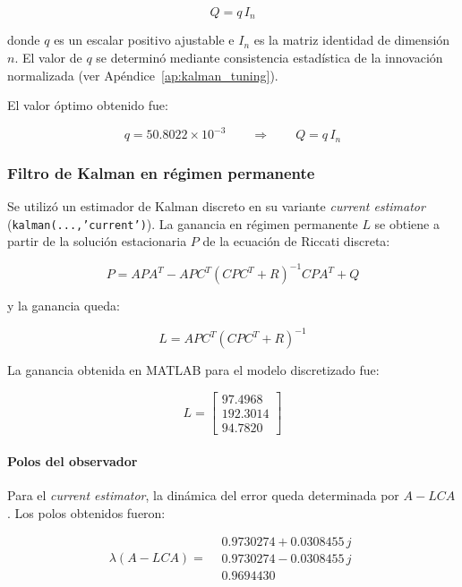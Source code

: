 \[
Q = q\,I_n
\]

donde $q$ es un escalar positivo ajustable e $I_n$ es la matriz identidad
de dimensión $n$. El valor de $q$ se determinó mediante consistencia
estadística de la innovación normalizada (ver Apéndice~\ref{ap:kalman_tuning}).

El valor óptimo obtenido fue:

\[
q = 50.8022\times 10^{-3}
\qquad\Longrightarrow\qquad
Q = q\,I_n
\]

\subsubsection{Filtro de Kalman en régimen permanente}

Se utilizó un estimador de Kalman discreto en su variante \textit{current estimator}
(\texttt{kalman(...,'current')}). La ganancia en régimen permanente \(L\) se obtiene
a partir de la solución estacionaria \(P\) de la ecuación de Riccati discreta:

\[
P = A P A^T - A P C^T \left(C P C^T + R\right)^{-1} C P A^T + Q
\]

y la ganancia queda:

\[
L = A P C^T \left(C P C^T + R\right)^{-1}
\]

La ganancia obtenida en MATLAB para el modelo discretizado fue:

\[
L =
\begin{bmatrix}
	97.4968\\
	192.3014\\
	94.7820
\end{bmatrix}
\]

\paragraph{Polos del observador}

Para el \textit{current estimator}, la dinámica del error queda
determinada por \(A - LCA\). Los polos obtenidos fueron:

\[
\lambda(A - LCA) =
\begin{aligned}
	&0.9730274 + 0.0308455\,j \\
	&0.9730274 - 0.0308455\,j \\
	&0.9694430
\end{aligned}
\]

